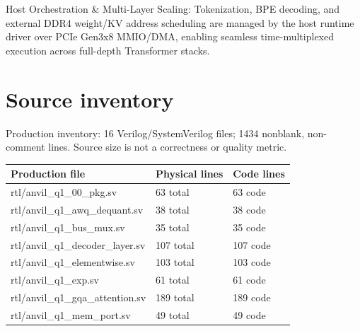 \documentclass[11pt,a4paper]{article}
\begin{document}
Host Orchestration \& Multi-Layer Scaling: Tokenization,\allowbreak{} BPE decoding,\allowbreak{} and external DDR4 weight/\allowbreak{}KV address scheduling are managed by the host runtime driver over PCIe Gen3x8 MMIO/\allowbreak{}DMA,\allowbreak{} enabling seamless time-multiplexed execution across full-depth Transformer stacks.


\appendix{}\section{Source inventory}

Production inventory: 16 Verilog/\allowbreak{}SystemVerilog files; 1434 nonblank,\allowbreak{} non-comment lines. Source size is not a correctness or quality metric.

{\small\renewcommand{\arraystretch}{1.18}\begin{longtable}{@{}L{0.55\textwidth}|L{0.18\textwidth}|L{0.18\textwidth}@{}}\toprule

\textbf{Production file} & \textbf{Physical lines} & \textbf{Code lines}\\\midrule\endhead

rtl/\allowbreak{}anvil\_\allowbreak{}q1\_\allowbreak{}00\_\allowbreak{}pkg.sv & 63 total & 63 code\\[2pt]\hline

rtl/\allowbreak{}anvil\_\allowbreak{}q1\_\allowbreak{}awq\_\allowbreak{}dequant.sv & 38 total & 38 code\\[2pt]\hline

rtl/\allowbreak{}anvil\_\allowbreak{}q1\_\allowbreak{}bus\_\allowbreak{}mux.sv & 35 total & 35 code\\[2pt]\hline

rtl/\allowbreak{}anvil\_\allowbreak{}q1\_\allowbreak{}decoder\_\allowbreak{}layer.sv & 107 total & 107 code\\[2pt]\hline

rtl/\allowbreak{}anvil\_\allowbreak{}q1\_\allowbreak{}elementwise.sv & 103 total & 103 code\\[2pt]\hline

rtl/\allowbreak{}anvil\_\allowbreak{}q1\_\allowbreak{}exp.sv & 61 total & 61 code\\[2pt]\hline

rtl/\allowbreak{}anvil\_\allowbreak{}q1\_\allowbreak{}gqa\_\allowbreak{}attention.sv & 189 total & 189 code\\[2pt]\hline

rtl/\allowbreak{}anvil\_\allowbreak{}q1\_\allowbreak{}mem\_\allowbreak{}port.sv & 49 total & 49 code\\[2pt]\hline


\end{longtable}}
\end{document}
